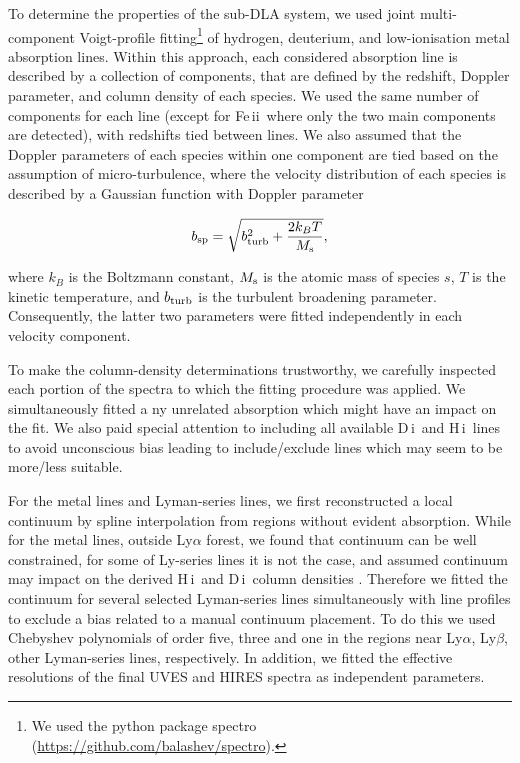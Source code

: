 \documentclass[fleqn,usenatbib]{mnras}
\newcommand{\DI}[0]{D\,{\sc i}}
\newcommand{\HI}[0]{H\,{\sc i}}
\newcommand{\FeII}[0]{Fe\,{\sc ii}}
\begin{document}
To determine the properties of the sub-DLA system, we used joint multi-component Voigt-profile fitting\footnote{We used the python package spectro (\url{https://github.com/balashev/spectro}).} of hydrogen, deuterium, and low-ionisation metal absorption lines. Within this approach, each considered absorption line is described by a collection of components, that are defined by the redshift, Doppler parameter, and column density of each species. We used the same number of components for each line (except for \FeII\ where only the two main components are detected), with redshifts tied between lines. We also assumed that the Doppler parameters of each species within one component are tied based on the assumption of micro-turbulence, where the velocity distribution of each species is described by a Gaussian function with Doppler parameter

\begin{equation}
 b_{\rm sp} = \sqrt{b_{\rm turb}^2 + \frac{2 k_B T}{M_{\rm s}}},
\end{equation}

where $k_B$ is the Boltzmann constant, $M_{\rm s}$ is the atomic mass of species $s$, $T$ is the kinetic temperature, and $b_{\rm turb}$ is the turbulent broadening parameter. Consequently, the latter two parameters were fitted independently in each velocity component.

To make the column-density determinations trustworthy, we carefully inspected each portion of the spectra to which the fitting procedure was applied. We simultaneously fitted a
ny unrelated absorption which might have an impact on the fit. We also paid special attention to including all available \DI\ and \HI\ lines to avoid unconscious bias leading to include/exclude lines which may seem to be more/less suitable.

For the metal lines and Lyman-series lines, we first reconstructed a local continuum by spline interpolation from regions without evident absorption. While for the metal lines, outside Ly$\alpha$ forest, we found that continuum can be well constrained, for some of Ly-series lines it is not the case, and assumed continuum may impact on the derived \HI\ and \DI\ column densities \citep[see, e.g.,][]{Balashev_2016}. Therefore we fitted the continuum for several selected Lyman-series lines simultaneously with line profiles to exclude a bias related to a manual continuum placement.  %
To do this we used Chebyshev polynomials of order five, three and one in the regions 
near Ly$\alpha$, Ly$\beta$, other Lyman-series lines, respectively.
In addition, we fitted the effective resolutions of the final UVES and HIRES spectra as independent parameters.
\end{document}
